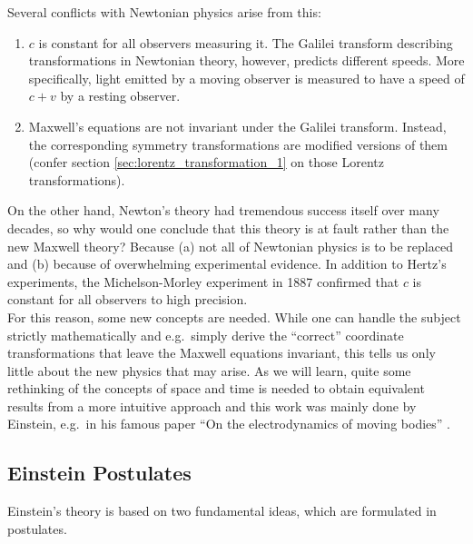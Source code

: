 \documentclass[../relativity_main.tex]{subfiles}
\begin{document}
Several conflicts with Newtonian physics arise from this:
\begin{enumerate}
	\item $c$ is constant for all observers measuring it. The Galilei transform describing transformations in Newtonian theory, however, predicts different speeds. More specifically, light emitted by a moving observer is measured to have a speed of $c + v$ by a resting observer.


	\item Maxwell's equations are not invariant under the Galilei transform. Instead, the corresponding symmetry transformations are modified versions of them (confer section \ref{sec:lorentz_transformation_1} on those Lorentz transformations).
\end{enumerate}

On the other hand, Newton's theory had tremendous success itself over many decades, so why would one conclude that this theory is at fault rather than the new Maxwell theory? Because (a) not all of Newtonian physics is to be replaced and (b) because of overwhelming experimental evidence. In addition to Hertz's experiments, the Michelson-Morley experiment in 1887 confirmed that $c$ is constant for all observers to high precision.\\


For this reason, some new concepts are needed. While one can handle the subject strictly mathematically and e.g.~simply derive the \enquote{correct} coordinate transformations that leave the Maxwell equations invariant, this tells us only little about the new physics that may arise. As we will learn, quite some rethinking of the concepts of space and time is needed to obtain equivalent results from a more intuitive approach and this work was mainly done by Einstein, e.g.~in his famous paper \enquote{On the electrodynamics of moving bodies} \cite{Einstein_1905}.



		\subsection{Einstein Postulates}
Einstein's theory is based on two fundamental ideas, which are formulated in postulates.
\end{document}
